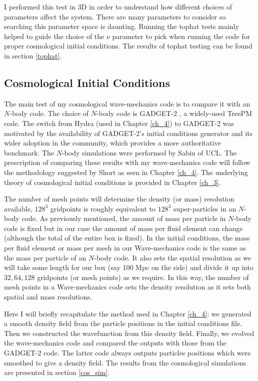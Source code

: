 I performed this test in 3D in order to understand how different choices of parameters affect the system. There are many parameters to consider so searching this parameter space is daunting. Running the tophat tests mainly helped to guide the choice of the $\nu$ parameter to pick when running the code for proper cosmological initial conditions. The results of tophat testing can be found in section \ref{tophat}.

\subsection{Cosmological Initial Conditions}
The main test of my cosmological wave-mechanics code is to compare it with an $N$-body code. The choice of $N$-body code is GADGET-2 \citep{bib_spr}, a widely-used TreePM code. The switch from Hydra (used in Chapter \ref{ch_4}) to GADGET-2 was motivated by the availability of GADGET-2's initial conditions generator and its wider adoption in the community, which provides a more authoritative benchmark. The $N$-body simulations were performed by Sabiu of UCL. The prescription of comparing these results with my wave-mechanics code will follow the methodology suggested by Short as seen in Chapter \ref{ch_4}. The underlying theory of cosmological initial conditions is provided in Chapter \ref{ch_3}.

The number of mesh points will determine the density (or mass) resolution available, $128^3$ gridpoints is roughly equivalent to $128^3$ super-particles in an $N$-body code. As previously mentioned, the amount of mass per particle in $N$-body code is fixed but in our case the amount of mass per fluid element can change (although the total of the entire box is fixed). In the initial conditions, the mass per fluid element or mass per mesh in our Wave-mechanics code is the same as the mass per particle of an $N$-body code.  It also sets the spatial resolution as we will take some length for our box (say 100 Mpc on the side) and divide it up into $32, 64, 128$ gridpoints (or mesh points) as we require. In this way, the number of mesh points in a Wave-mechanics code sets the density resolution as it sets both spatial and mass resolutions.

Here I will briefly recapitulate the method used in Chapter \ref{ch_4}: we generated a smooth density field from the particle positions in the initial conditions file. Then we constructed the wavefunction from this density field. Finally, we evolved the wave-mechanics code and compared the outputs with those from the GADGET-2 code. The latter code always outputs particles positions which were smoothed to give a density field. The results from the cosmological simulations are presented in section \ref{cos_sim}.

